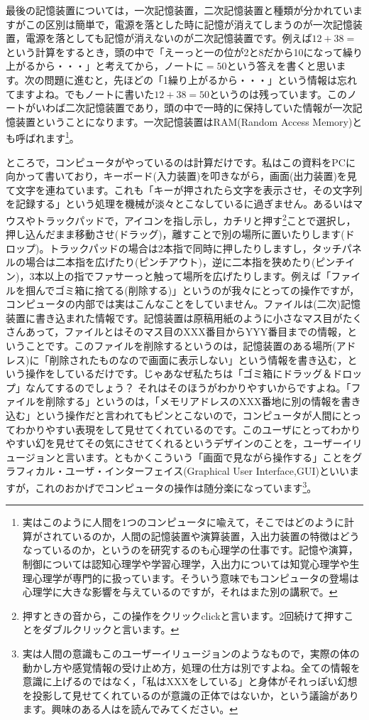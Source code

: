 \documentclass{ltjsbook}
\begin{document}
最後の記憶装置については，一次記憶装置，二次記憶装置と種類が分かれていますがこの区別は簡単で，電源を落とした時に記憶が消えてしまうのが一次記憶装置，電源を落としても記憶が消えないのが二次記憶装置です。例えば$12+38=$という計算をするとき，頭の中で「えーっと一の位が2と8だから10になって繰り上がるから・・・」と考えてから，ノートに$=50$という答えを書くと思います。次の問題に進むと，先ほどの「1繰り上がるから・・・」という情報は忘れてますよね。でもノートに書いた$12+38=50$というのは残っています。このノートがいわば二次記憶装置であり，頭の中で一時的に保持していた情報が一次記憶装置ということになります。一次記憶装置はRAM(Random Access Memory)とも呼ばれます\footnote{実はこのように人間を1つのコンピュータに喩えて，そこではどのように計算がされているのか，人間の記憶装置や演算装置，入出力装置の特徴はどうなっているのか，というのを研究するのも心理学の仕事です。記憶や演算，制御については認知心理学や学習心理学，入出力については知覚心理学や生理心理学が専門的に扱っています。そういう意味でもコンピュータの登場は心理学に大きな影響を与えているのですが，それはまた別の講釈で。}。

ところで，コンピュータがやっているのは計算だけです。私はこの資料をPCに向かって書いており，キーボード(入力装置)を叩きながら，画面(出力装置)を見て文字を連ねています。これも「キーが押されたら文字を表示させ，その文字列を記録する」という処理を機械が淡々とこなしているに過ぎません。あるいはマウスやトラックパッドで，アイコンを指し示し，カチリと押す\footnote{押すときの音から，この操作をクリックclickと言います。2回続けて押すことをダブルクリックと言います。}ことで選択し，押し込んだまま移動させ(ドラッグ)，離すことで別の場所に置いたりします(ドロップ)。トラックパッドの場合は2本指で同時に押したりしますし，タッチパネルの場合は二本指を広げたり(ピンチアウト)，逆に二本指を狭めたり(ピンチイン)，3本以上の指でファサーっと触って場所を広げたりします。例えば「ファイルを掴んでゴミ箱に捨てる(削除する)」というのが我々にとっての操作ですが，コンピュータの内部では実はこんなことをしていません。ファイルは(二次)記憶装置に書き込まれた情報です。記憶装置は原稿用紙のように小さなマス目がたくさんあって，ファイルとはそのマス目のXXX番目からYYY番目までの情報，ということです。このファイルを削除するというのは，記憶装置のある場所(アドレス)に「削除されたものなので画面に表示しない」という情報を書き込む，という操作をしているだけです。じゃあなぜ私たちは「ゴミ箱にドラッグ＆ドロップ」なんてするのでしょう？ それはそのほうがわかりやすいからですよね。「ファイルを削除する」というのは，「メモリアドレスのXXX番地に別の情報を書き込む」という操作だと言われてもピンとこないので，コンピュータが人間にとってわかりやすい表現をして見せてくれているのです。このユーザにとってわかりやすい幻を見せてその気にさせてくれるというデザインのことを，ユーザーイリュージョンと言います。ともかくこういう「画面で見ながら操作する」ことをグラフィカル・ユーザ・インターフェイス(Graphical User Interface,GUI)といいますが，これのおかげでコンピュータの操作は随分楽になっています\footnote{実は人間の意識もこのユーザーイリュージョンのようなもので，実際の体の動かし方や感覚情報の受け止め方，処理の仕方は別ですよね。全ての情報を意識に上げるのではなく，「私はXXXをしている」と身体がそれっぽい幻想を投影して見せてくれているのが意識の正体ではないか，という議論があります。興味のある人は\citet{トールノーレットランダーシュ2002}を読んでみてください。}。
\end{document}
